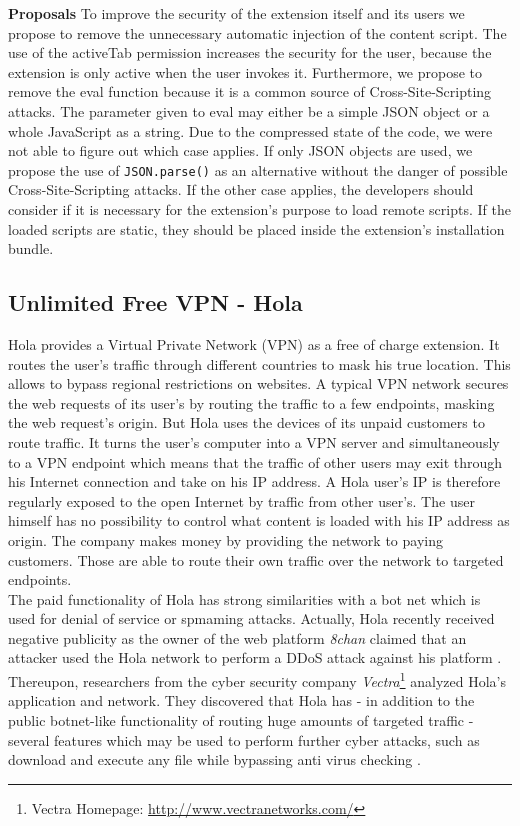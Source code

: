 \documentclass[article,colorback,accentcolor=tud9c,type=bsc]{tudthesis}
\let\stdsubsection\subsection
\renewcommand\subsection{\newpage\stdsubsection}
\begin{document}
	\textbf{Proposals} To improve the security of the extension itself and its users we propose to remove the unnecessary automatic injection of the content script. The use of the activeTab permission increases the security for the user, because the extension is only active when the user invokes it. Furthermore, we propose to remove the eval function because it is a common source of Cross-Site-Scripting attacks. The parameter given to eval may either be a simple JSON object or a whole JavaScript as a string. Due to the compressed state of the code, we were not able to figure out which case applies. If only JSON objects are used, we propose the use of \texttt{JSON.parse()} as an alternative without the danger of possible Cross-Site-Scripting attacks. If the other case applies, the developers should consider if it is necessary for the extension's purpose to load remote scripts. If the loaded scripts are static, they should be placed inside the extension's installation bundle. \\
	
\subsection{Unlimited Free VPN - Hola}
	Hola provides a Virtual Private Network (VPN) as a free of charge extension. It routes the user's traffic through different countries to mask his true location. This allows to bypass regional restrictions on websites. A typical VPN network secures the web requests of its user's by routing the traffic to a few endpoints, masking the web request's origin. But Hola uses the devices of its unpaid customers to route traffic. It turns the user's computer into a VPN server and simultaneously to a VPN endpoint which means that the traffic of other users may exit through his Internet connection and take on his IP address. A Hola user's IP is therefore regularly exposed to the open Internet by traffic from other user's. The user himself has no possibility to control what content is loaded with his IP address as origin. The company makes money by providing the network to paying customers. Those are able to route their own traffic over the network to targeted endpoints. \\
	
	The paid functionality of Hola has strong similarities with a bot net which is used for denial of service or spmaming attacks. Actually, Hola recently received negative publicity as the owner of the web platform \textit{8chan} claimed that an attacker used the Hola network to perform a DDoS attack against his platform \cite{8chanHola}. Thereupon, researchers from the cyber security company \textit{Vectra}\footnote{Vectra Homepage: \url{http://www.vectranetworks.com/}} analyzed Hola's application and network. They discovered that Hola has - in addition to the public botnet-like functionality of routing huge amounts of targeted traffic - several features which may be used to perform further cyber attacks, such as download and execute any file while bypassing anti virus checking \cite{vectraHola}. \\ 
	
\end{document}
